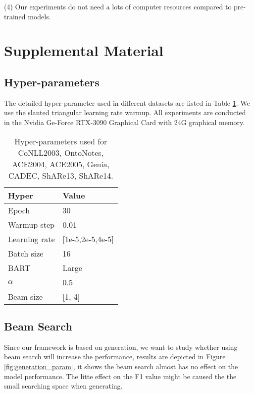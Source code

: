 \documentclass[11pt,a4paper]{article}
\begin{document}
(4) Our experiments do not  need a lots of computer resources compared to pre-trained models.








\clearpage
\appendix
\section{Supplemental Material}

\subsection{Hyper-parameters} \label{supply:random_search}


The detailed hyper-parameter used in different datasets are listed in Table \ref{tb:hyper}. We use the slanted triangular learning rate warmup. All experiments are conducted in the Nvidia Ge-Force RTX-3090 Graphical Card with 24G graphical memory.

\begin{table}[ht]
  \begin{tabular}{l|l}
  \toprule
  Hyper       & Value                                            \\
  \midrule
  Epoch       & 30                                               \\
  Warmup step & 0.01                                             \\
  Learning rate          & [1e-5,2e-5,4e-5] \\
  Batch size  & 16                                               \\
  BART        & Large                                           \\
  $\alpha$    & 0.5                                            \\
  Beam size  & [1, 4]  \\
  \bottomrule
  \end{tabular}
  \caption{Hyper-parameters used for CoNLL2003, OntoNotes, ACE2004, ACE2005, Genia, CADEC, ShARe13, ShARe14.}
  \label{tb:hyper}
\end{table}

\subsection{Beam Search}
Since our framework is based on generation, we want to study whether using beam search will increase the performance, results are depicted in Figure \ref{fig:generation_param}, it shows the beam search almost has no effect on the model performance. The litte effect on the F1 value might be caused the the small searching space when generating.
\end{document}
